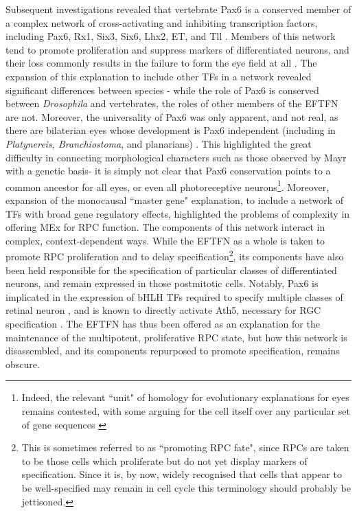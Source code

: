 Subsequent investigations revealed that vertebrate Pax6 is a conserved member of a complex network of cross-activating and inhibiting transcription factors, including Pax6, Rx1, Six3, Six6, Lhx2, ET, and Tll \cite{Zuber2003}. Members of this network tend to promote proliferation and suppress markers of differentiated neurons, and their loss commonly results in the failure to form the eye field at all \cite{Agathocleous2009}. The expansion of this explanation to include other TFs in a network revealed significant differences between species \cite{Wagner2007}- while the role of Pax6 is conserved between \textit{Drosophila} and vertebrates, the roles of other members of the EFTFN are not. Moreover, the universality of Pax6 was only apparent, and not real, as there are bilaterian eyes whose development is Pax6 independent (including in \textit{Platynereis, Branchiostoma}, and planarians) \cite{Kozmik2008}. This highlighted the great difficulty in connecting morphological characters such as those observed by Mayr with a genetic basis- it is simply not clear that Pax6 conservation points to a common ancestor for all eyes, or even all photoreceptive neurons\footnote{Indeed, the relevant ``unit" of homology for evolutionary explanations for eyes remains contested, with some arguing for the cell itself over any particular set of gene sequences \cite{Erclik2009}}. Moreover, expansion of the monocausal ``master gene" explanation, to include a network of TFs with broad gene regulatory effects, highlighted the problems of complexity in offering MEx for RPC function. The components of this network interact in complex, context-dependent ways. While the EFTFN as a whole is taken to promote RPC proliferation and to delay specification\footnote{This is sometimes referred to as ``promoting RPC fate", since RPCs are taken to be those cells which proliferate but do not yet display markers of specification. Since it is, by now, widely recognised that cells that appear to be well-specified may remain in cell cycle \cite{Godinho2007,Engerer2017} this terminology should probably be jettisoned.}, its components have also been held responsible for the specification of particular classes of differentiated neurons, and remain expressed in those postmitotic cells. Notably, Pax6 is implicated in the expression of bHLH TFs required to specify multiple classes of retinal neuron \cite{Marquardt2001}, and is known to directly activate Ath5, necessary for RGC specification \cite{Willardsen2009}. The EFTFN has thus been offered as an explanation for the maintenance of the multipotent, proliferative RPC state, but how this network is disassembled, and its components repurposed to promote specification, remains obscure.

